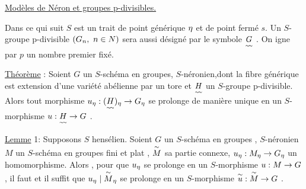 \uline{Modèles de Néron et groupes p-divisibles.}

Dans ce qui suit $S$ est un trait de point générique $\eta$ et de point
fermé $s$. Un $S$-groupe p-divisible $(G_n,\ n\handwritten{\in}N)$ sera aussi désigné par
le symbole $\underset{\scriptscriptstyle\sim\!\sim}{G}$ . On igne par $p$ un nombre premier fixé.

\uline{Théorème} : Soient $G$ un $S$-schéma en groupes, $S$-néronien,\handwritten{[}dont la fibre générique est extension d'une variété abélienne par un tore\handwritten{]} et $\underset{\scriptscriptstyle\sim\!\sim}{H}$ un $S$-groupe
p-divisible. Alors tout morphisme $u_{\eta}:(\underset{\scriptscriptstyle\sim\!\sim}{H})_{\eta}\to G_{\eta}$ se prolonge de manière unique en un $S$-morphisme $u:\underset{\scriptscriptstyle\sim\!\sim}{H}\to G$ .

\uline{Lemme} 1: Supposons $S$ hensélien. Soient $G$ un $S$-schéma en groupes , $S$-néronien \handwritten{,} $M$ un $S$-schéma en groupes fini et plat , $\overset{\sim}{M}$ sa partie connexe,
 $u_{\eta}:M_{\eta}\to G_{\eta}$ un homomorphisme. Alors , pour que $u_{\eta}$ se prolonge en
un $S$-morphisme $u:M\to G$, il faut et il suffit que $u_{\eta}\mid\overset{\sim}{M}_{\eta}$ se prolonge
en un $S$-morphisme $\overset{\sim}{u}:\overset{\sim}{M}\to G$ .

